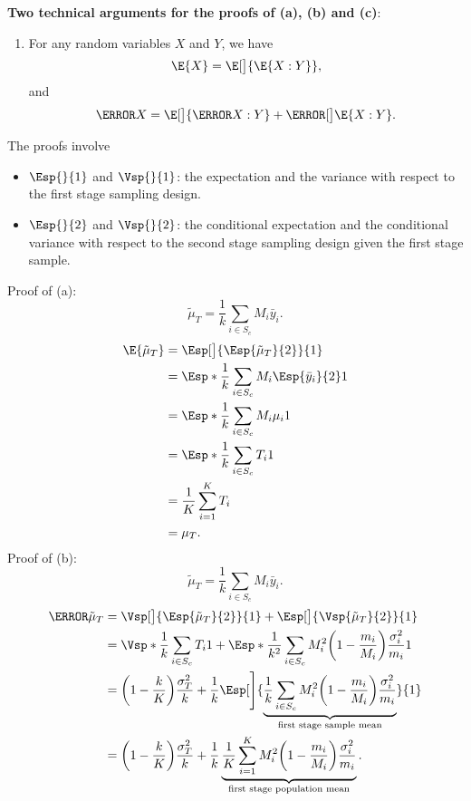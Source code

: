 \textbf{Two technical arguments for the proofs of (a), (b) and (c)}:
\begin{enumerate}
      \item For any random variables $ X $ and $ Y $, we have
            \[ \E{X}=\E[\big]{\E{X\given Y}}, \]
            and
            \[ \V{X}=\E[\big]{\V{X\given Y}}+\V[\big]{\E{X\given Y}}. \]
\end{enumerate}
The proofs involve
\begin{itemize}
      \item $ \Esp{}{1} $ and $ \Vsp{}{1} $: the expectation and the variance with respect to the first stage sampling design.
      \item $ \Esp{}{2} $ and $ \Vsp{}{2} $: the conditional expectation and the conditional
            variance with respect to the second stage sampling design given
            the first stage sample.
\end{itemize}
Proof of (a):
\[ \tilde{\mu}_T=\frac{1}{k}\sum_{i\in S_c}M_i\bar{y}_i. \]
\begin{align*}
      \E{\tilde{\mu}_T}
       & =\Esp[\big]{ \Esp{\tilde{\mu}_T}{2} }{1}                    \\
       & =\Esp*{\frac{1}{k}\sum_{i\in S_c}M_i\Esp{\bar{y}_i}{2} }{1} \\
       & =\Esp*{\frac{1}{k}\sum_{i\in S_c}M_i\mu_i}{1}               \\
       & =\Esp*{\frac{1}{k}\sum_{i\in S_c}T_i}{1}                    \\
       & =\frac{1}{K}\sum_{i=1}^{K}T_i                               \\
       & =\mu_T.
\end{align*}
Proof of (b):
\[ \tilde{\mu}_T=\frac{1}{k}\sum_{i\in S_c}M_i\bar{y}_i. \]
\begin{align*}
      \V{\tilde{\mu}_T}
       & =\Vsp[\big]{\Esp{\tilde{\mu}_T}{2}}{1}+\Esp[\big]{\Vsp{\tilde{\mu}_T}{2}}{1}                                                                                                                                   \\
       & =\Vsp*{\frac{1}{k}\sum_{i\in S_c}T_i}{1}+\Esp*{\frac{1}{k^2}\sum_{i\in S_c}M_i^2\biggl(1-\frac{m_i}{M_i}\biggr)\frac{\sigma_i^2}{m_i}}{1}                                                                      \\
       & =\biggl(1-\frac{k}{K}\biggr)\frac{\sigma_T^2}{k}+\frac{1}{k}\Esp[\Bigg]{\underbrace{\frac{1}{k}\sum_{i\in S_c}M_i^2\biggl(1-\frac{m_i}{M_i}\biggr)\frac{\sigma_i^2}{m_i}}_{\text{first stage sample mean}}}{1} \\
       & =\biggl(1-\frac{k}{K}\biggr)\frac{\sigma_T^2}{k}+\frac{1}{k}
      \underbrace{\frac{1}{K}\sum_{i=1}^{K}M_i^2\biggl(1-\frac{m_i}{M_i}\biggr)\frac{\sigma_i^2}{m_i}}_{\text{first stage population mean}}.
\end{align*}
